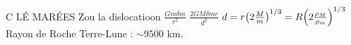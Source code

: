 \begin{solution}
\begin{questions}
        \question C LÉ MARÉES
        \question Zou la dislocatioon 
        \question $ \frac{Gm\delta m}{r^2} $
        \question $ \frac{2GM \delta m r}{d^3} $
        \question $ d = r\qty( 2\frac{M}{m})^{1/3} = R\qty(2\frac{\rho_M}{\rho_m})^{1/3}$
        \question Rayon de Roche Terre-Lune : $\sim 9500$ km.
\end{questions}
\end{solution}